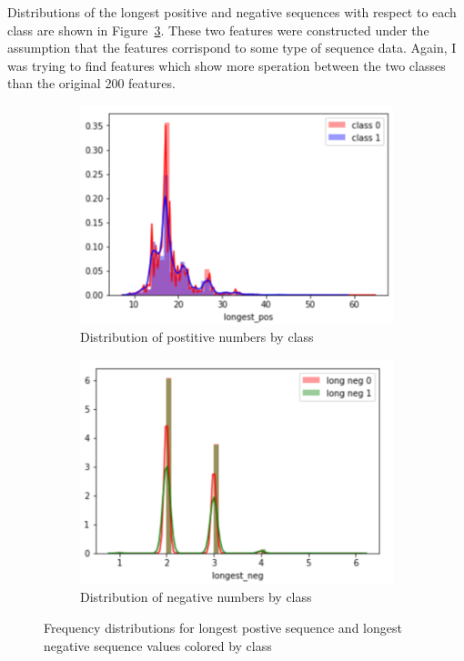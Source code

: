 \documentclass[11pt,letterpaper]{article}
\begin{document}
Distributions of the longest positive and negative sequences with respect to
each class are shown in Figure~\ref{fig:count_dist}.  These two features were
constructed under the assumption that the features corrispond to some type of
sequence data.  Again, I was trying to find features which show more speration
between the two classes than the original 200 features.

\begin{figure}[h!]
    \centering
    \begin{subfigure}[]{.4\textwidth}
        \includegraphics[width=\textwidth]{long_pos_dist.png}
        \caption{Distribution of postitive numbers by class}
        \label{fig:pos_dist}
    \end{subfigure}
    \begin{subfigure}[]{.4\textwidth}
        \includegraphics[width=\textwidth]{long_neg_dist.png}
        \caption{Distribution of negative numbers by class}
        \label{fig:neg_dist}
    \end{subfigure}
    \caption{Frequency distributions for longest postive sequence and longest
negative sequence values colored by class}
    \label{fig:count_dist}
\end{figure}
\end{document}
